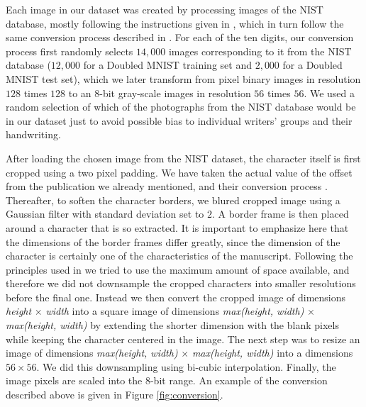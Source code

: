 \documentclass[eng]{simposium}
\begin{document}
Each image in our dataset was created by processing images of the NIST database, 
mostly following the instructions given in \cite{1}, which in turn follow the same conversion process described in \cite{8}. 
For each of the ten digits, our conversion process first randomly selects $14,000$ images corresponding to it from the NIST 
database ($12,000$ for a Doubled MNIST training set and $2,000$ for a Doubled MNIST test set), which we later transform 
from pixel binary images in resolution $128$ times $128$ to an 8-bit gray-scale images in resolution $56$ times $56$. 
We used a random selection of which of the photographs from the NIST database would be in our dataset just to avoid possible 
bias to individual writers' groups and their handwriting. 

After loading the chosen image from the NIST dataset, the character itself is first cropped using a two pixel padding. 
We have taken the actual value of the offset from the publication we already mentioned, and their conversion process \cite{1}. 
Thereafter, to soften the character borders, we blured cropped image using a Gaussian filter with standard deviation set to $2$. 
A border frame is then placed around a character that is so extracted. 
It is important to emphasize here that the dimensions of the border frames differ greatly, since the dimension of the 
character is certainly one of the characteristics of the manuscript. 
Following the principles used in \cite{1} we tried to use the maximum amount of space available, and 
therefore we did not downsample the cropped characters into smaller resolutions before the final one. 
Instead we then convert the cropped image of dimensions \textit{height} $\times$ \textit{width} into a square image of dimensions 
\textit{max(height, width)} $\times$ \textit{max(height, width)} by extending the shorter dimension with the blank pixels 
while keeping the character centered in the image. 
The next step was to resize an image of dimensions \textit{max(height, width)} $\times$ \textit{max(height, width)} into a 
dimensions $56 \times 56$.
We did this downsampling using bi-cubic interpolation. 
Finally, the image pixels are scaled into the 8-bit range. 
An example of the conversion described above is given in Figure \ref{fig:conversion}. 
\end{document}
